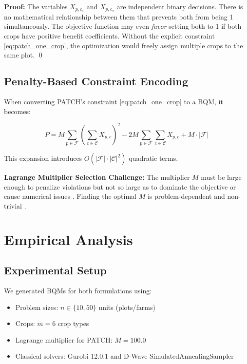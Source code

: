 \documentclass[11pt,a4paper]{article}
\begin{document}
\textbf{Proof:}
The variables $X_{p,c_1}$ and $X_{p,c_2}$ are independent binary decisions. There is no mathematical relationship between them that prevents both from being 1 simultaneously. The objective function may even \emph{favor} setting both to 1 if both crops have positive benefit coefficients. Without the explicit constraint \eqref{eq:patch_one_crop}, the optimization would freely assign multiple crops to the same plot. \qed

\subsection{Penalty-Based Constraint Encoding}

When converting PATCH's constraint \eqref{eq:patch_one_crop} to a BQM, it becomes:

\begin{equation}
P = M \sum_{p \in \mathcal{F}} \left(\sum_{c \in \mathcal{C}} X_{p,c}\right)^2 - 2M \sum_{p \in \mathcal{F}} \sum_{c \in \mathcal{C}} X_{p,c} + M \cdot |\mathcal{F}|
\end{equation}

This expansion introduces $O(|\mathcal{F}| \cdot |\mathcal{C}|^2)$ quadratic terms.

\textbf{Lagrange Multiplier Selection Challenge:}
The multiplier $M$ must be large enough to penalize violations but not so large as to dominate the objective or cause numerical issues \cite{montanez2023unbalanced}. Finding the optimal $M$ is problem-dependent and non-trivial \cite{lee2025slack}.

\section{Empirical Analysis}

\subsection{Experimental Setup}

We generated BQMs for both formulations using:
\begin{itemize}
    \item Problem sizes: $n \in \{10, 50\}$ units (plots/farms)
    \item Crops: $m = 6$ crop types
    \item Lagrange multiplier for PATCH: $M = 100.0$
    \item Classical solvers: Gurobi 12.0.1 and D-Wave SimulatedAnnealingSampler
\end{itemize}
\end{document}

